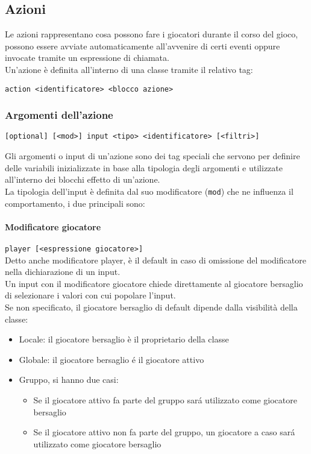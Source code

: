 \subsection{Azioni}
Le azioni rappresentano cosa possono fare i giocatori durante il corso del gioco, possono essere avviate
automaticamente all'avvenire di certi eventi oppure invocate tramite un espressione di chiamata.\\
Un'azione è definita all'interno di una classe tramite il relativo tag: 
\begin{lstlisting}
action <identificatore> <blocco azione>
\end{lstlisting}

\subsubsection{Argomenti dell'azione} \label{InputAzione}
\begin{lstlisting}
[optional] [<mod>] input <tipo> <identificatore> [<filtri>]
\end{lstlisting}
Gli argomenti o input di un’azione sono dei tag speciali che servono per definire delle variabili 
inizializzate in base alla tipologia degli argomenti e utilizzate all’interno dei 
blocchi effetto di un’azione. \\
La tipologia dell'input è definita dal suo modificatore (\lstinline|mod|) che ne influenza il comportamento, 
i due principali sono:

\paragraph{Modificatore giocatore}
\lstinline|player [<espressione giocatore>]| \\
Detto anche modificatore player, è il default in caso di omissione del modificatore nella
dichiarazione di un input. \\
Un input con il modificatore giocatore chiede direttamente al giocatore bersaglio di 
selezionare i valori con cui popolare l'input. \\
Se non specificato, il giocatore bersaglio di default dipende dalla visibilità della classe:
\begin{itemize}
    \item Locale: il giocatore bersaglio è il proprietario della classe
    \item Globale: il giocatore bersaglio é il giocatore attivo 
    \item {
        Gruppo, si hanno due casi:
        \begin{itemize}
            \item Se il giocatore attivo fa parte del gruppo sará utilizzato come giocatore bersaglio
            \item Se il giocatore attivo non fa parte del gruppo, un giocatore a caso sará utilizzato come giocatore bersaglio
        \end{itemize}
    }
\end{itemize}

